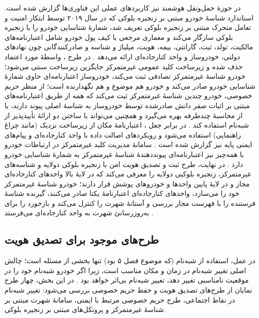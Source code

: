 \documentclass[12pt,a4paper]{article}
\begin{document}
در حوزهٔ حمل‌ونقل هوشمند نیز کاربرد‌های عملی این فناوری‌ها گزارش شده است. استاندارد شناسهٔ خودرو  مبتنی بر زنجیره بلوکی که در سال ۲۰۱۹ توسط ابتکار امنیت و تعامل متحرک مبتنی بر زنجیره بلوکی  تعریف شد، شمارهٔ شناسایی خودرو را با زنجیره بلوکی سازگار می‌کند و معماری مرجعی با کیف پول خودرو شامل اعتبارنامه‌های مالکیت، تولد، ثبت، گارانتی، بیمه، هویت، میلیاژ و شناسه و صادرکنندگانی چون نهاد‌های دولتی، خودروساز و واحد کنارجاده‌ای ارائه می‌دهد \cite{mazzocca2025survey}. در طرح ، واسطهٔ مورد اعتماد حذف شده و زیرساخت کلید عمومی غیرمتمرکز جایگزین زیرساخت سنتی می‌شود؛ خودرو شناسهٔ غیرمتمرکز تصادفی ثبت می‌کند، خودروساز اعتبارنامه‌ای حاوی شمارهٔ شناسایی خودرو صادر می‌کند و خودرو هم موضوع و هم نگهدارنده است؛ از منظر حریم خصوصی، خودرو چندین شناسهٔ غیرمتمرکز ثبت می‌کند که همه از طریق اعتبارنامه‌های مبتنی بر اثبات صفر دانش صادرشده توسط خودروساز به شناسهٔ اصلی پیوند دارند، یا از محاسبهٔ چندطرفه بهره می‌گیرد و همچنین می‌تواند با ساختن دو ارائهٔ تأییدپذیر از شبه‌نام استفاده کند \cite{mazzocca2025survey}. در برابر جعل ، اعتبارنامهٔ مکان از زیرساخت نزدیک (مانند چراغ راهنمایی) استفاده می‌شود و رویکرد‌های اصالت داده با واحد کنارجاده‌ای و پیام‌های ایمنی پایه نیز گزارش شده است \cite{mazzocca2025survey}. سامانهٔ مدیریت کلید غیرمتمرکز در ارتباطات خودرو با همه‌چیز نیز اعتبارنامه‌ای پیونددهندهٔ شناسهٔ غیرمتمرکز به شمارهٔ شناسایی خودرو دارد \cite{mazzocca2025survey}. در نهایت، طرح ثبت و تصدیق هویت امن با زنجیره بلوکی دولایه و شناسه‌های غیرمتمرکز، زنجیره بلوکیی دولایه را معرفی می‌کند که در لایهٔ بالا واحد‌های کنارجاده‌ای مجاز و در لایهٔ پایین واحد‌ها و خودرو‌های پوشش قرار دارند؛ خودرو شناسهٔ غیرمتمرکز خود را می‌سازد، واحد‌های کنارجاده‌ای اعتبارنامهٔ یکتا صادر می‌کنند، گیرنده شناسهٔ فرستنده را با فهرست مجاز بررسی و آستانهٔ شهرت را کنترل می‌کند و بازخورد را برای به‌روزرسانیٔ شهرت به واحد کنارجاده‌ای می‌فرستد \cite{mazzocca2025survey}.

\subsection{طرح‌های موجود برای تصدیق هویت}

در عمل، استفاده از شبه‌نام (که موضوع فصل ۵ بود) تنها بخشی از مسئله است؛ چالش اصلی تغییر شبه‌نام در زمان و مکان مناسب است، زیرا اگر خودرو شبه‌نام خود را در موقعیت نامناسبی تغییر دهد، تغییر شبه‌نام بی‌اثر خواهد بود \cite{luPseudonymChangingSocial2012, al-aniPrivacySafetyImprovement2023, rahmawatiagustinaSystematicLiteratureReview2025}. در این بخش، چهار طرح نمایان از طرح‌های تصدیق هویت و حفظ حریم خصوصی بررسی می‌شود: تغییر شبه‌نام در نقاط اجتماعی، طرح حریم خصوصی مرتبط با ایمنی، سامانهٔ شهرت مبتنی بر شناسهٔ غیرمتمرکز و پروتکل‌های مبتنی بر زنجیره بلوکی.
\end{document}
